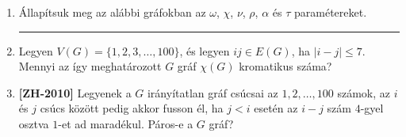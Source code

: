 \documentclass[a4paper, 12pt]{article}
\begin{document}
\begin{enumerate}
            \item Állapítsuk meg az alábbi gráfokban az $\omega$, $\chi$, $\nu$, $\rho$, $\alpha$ és $\tau$ paramétereket.
            \begin{figure}[!h]
                \centering
                \begin{subfigure}{0.24\textwidth}
                    \centering		
                    
                \end{subfigure}
                \begin{subfigure}{0.24\textwidth}
                    \centering
                    
                \end{subfigure}
                \begin{subfigure}{0.24\textwidth}
                    \centering
                    
                \end{subfigure}
                \begin{subfigure}{0.24\textwidth}
                    \centering
                    
                \end{subfigure}
            \end{figure}
            
            \hrule

            \item Legyen $V(G)=\{1,2,3, \ldots , 100\}$, és legyen $ij \in E(G)$, ha $|i-j|\leq 7$. Mennyi az így meghatározott $G$ gráf $\chi(G)$ kromatikus száma?
            
            \item \textbf{[ZH-2010]} Legyenek a $G$ irányítatlan gráf csúcsai az $1, 2, \ldots, 100$ számok, az $i$ és $j$ csúcs között pedig akkor fusson él, ha $j<i$ esetén az $i-j$ szám $4$-gyel osztva $1$-et ad maradékul. Páros-e a $G$ gráf?
            
            
            

\end{enumerate}
\end{document}

